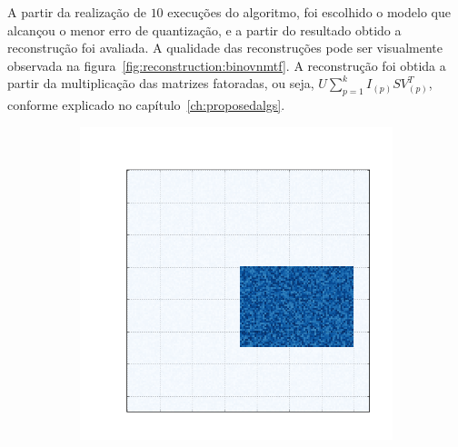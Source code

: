\documentclass[
    12pt,                %
    oneside,            %
    a4paper,            %
    english,            %
    brazil                %
    ]{abntex2ppgsi}
\begin{document}
A partir da realização de $10$ execuções do algoritmo, foi escolhido o modelo que alcançou o menor erro de quantização, e a partir do resultado obtido a reconstrução foi avaliada. A qualidade das reconstruções pode ser visualmente observada na figura~\ref{fig:reconstruction:binovnmtf}. A reconstrução foi obtida a partir da multiplicação das matrizes fatoradas, ou seja, $U \sum_{p=1}^{k} I_{(p)} S V_{(p)}^T$, conforme explicado no capítulo~\ref{ch:proposedalgs}.

\begin{figure}[H]
\centering
    \caption{
        As primeiras cinco matrizes são as matrizes originais, as demais são suas respectivas reconstruções, realizadas a partir dos resultados obtidos com o algoritmo \textit{BinOvNMTF}.
    }
    \begin{subfigure}[b]{0.18\textwidth}
        \includegraphics[width=\textwidth]{img/a-bic-structure.png}
    \end{subfigure}
    \begin{subfigure}[b]{0.18\textwidth}

\end{subfigure}
\end{figure}
\end{document}
